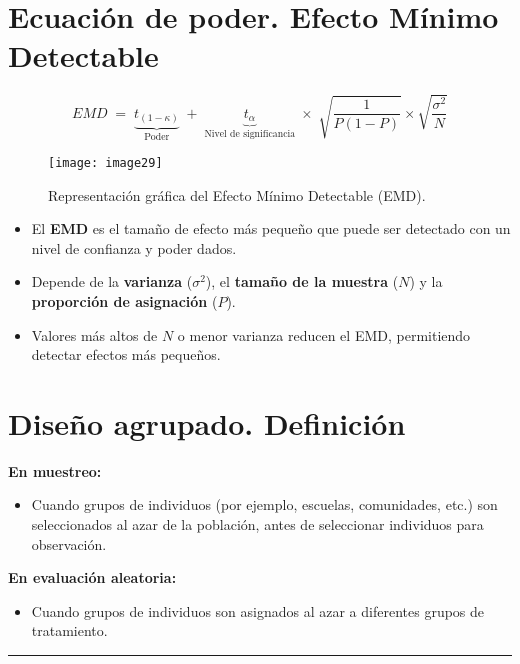 \documentclass[12pt]{article}
\begin{document}
\section*{\noindent\textbf{Ecuación de poder. Efecto Mínimo Detectable}}

\[
EMD \;=\; \underbrace{t_{(1-\kappa)}}_{\text{Poder}} 
\;+\; \underbrace{t_{\alpha}}_{\text{Nivel de significancia}}
\;\times\; 
\sqrt{\frac{1}{P(1-P)}} \times \sqrt{\frac{\sigma^2}{N}}
\]

\begin{figure}[H]
    \centering
    \texttt{[image: image29]}
    \caption{\footnotesize Representación gráfica del Efecto Mínimo Detectable (EMD).}
\end{figure}

\begin{itemize}
    \item El \textbf{EMD} es el tamaño de efecto más pequeño que puede ser detectado con un nivel de confianza y poder dados.  
    \item Depende de la \textbf{varianza} ($\sigma^2$), el \textbf{tamaño de la muestra} ($N$) y la \textbf{proporción de asignación} ($P$).  
    \item Valores más altos de $N$ o menor varianza reducen el EMD, permitiendo detectar efectos más pequeños.  
\end{itemize}

\section*{\noindent\textbf{Diseño agrupado. Definición}}

\textbf{En muestreo:}
\begin{itemize}
    \item Cuando grupos de individuos (por ejemplo, escuelas, comunidades, etc.) son seleccionados al azar de la población, antes de seleccionar individuos para observación.
\end{itemize}

\textbf{En evaluación aleatoria:}
\begin{itemize}
    \item Cuando grupos de individuos son asignados al azar a diferentes grupos de tratamiento.
\end{itemize}

\hrule
\end{document}
